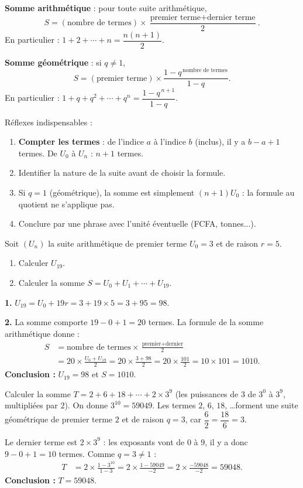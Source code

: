 \documentclass[11pt]{article}
\begin{document}
\begin{methode}
\textbf{Somme arithmétique} : pour toute suite arithmétique,
\[ S = (\text{nombre de termes})\times\frac{\text{premier terme}+\text{dernier terme}}{2}. \]
En particulier : $1+2+\cdots+n=\dfrac{n(n+1)}{2}$.

\textbf{Somme géométrique} : si $q\neq 1$,
\[ S = (\text{premier terme})\times\frac{1-q^{\,\text{nombre de termes}}}{1-q}. \]
En particulier : $1+q+q^2+\cdots+q^n=\dfrac{1-q^{\,n+1}}{1-q}$.

Réflexes indispensables :
\begin{enumerate}
\item \textbf{Compter les termes} : de l'indice $a$ à l'indice $b$ (inclus), il y a $b-a+1$ termes. De $U_0$ à $U_n$ : $n+1$ termes.
\item Identifier la nature de la suite avant de choisir la formule.
\item Si $q=1$ (géométrique), la somme est simplement $(n+1)U_0$ : la formule au quotient ne s'applique pas.
\item Conclure par une phrase avec l'unité éventuelle (FCFA, tonnes...).
\end{enumerate}
\end{methode}

\begin{exoresolu}
Soit $(U_n)$ la suite arithmétique de premier terme $U_0=3$ et de raison $r=5$.
\begin{enumerate}
\item Calculer $U_{19}$.
\item Calculer la somme $S=U_0+U_1+\cdots+U_{19}$.
\end{enumerate}
\tcblower
\textbf{1.} $U_{19}=U_0+19r=3+19\times 5=3+95=98$.

\textbf{2.} La somme comporte $19-0+1=20$ termes. La formule de la somme arithmétique donne :
\begin{align*}
S &= \text{nombre de termes}\times\frac{\text{premier}+\text{dernier}}{2}\\
&= 20\times\frac{U_0+U_{19}}{2} = 20\times\frac{3+98}{2} = 20\times\frac{101}{2} = 10\times 101 = 1010.
\end{align*}
\textbf{Conclusion :} $U_{19}=98$ et $S=1010$.
\end{exoresolu}

\begin{exoresolu}
Calculer la somme $T=2+6+18+\cdots+2\times 3^{9}$ (les puissances de $3$ de $3^0$ à $3^9$, multipliées par $2$). On donne $3^{10}=59049$.
\tcblower
Les termes $2$, $6$, $18$, \ldots forment une suite géométrique de premier terme $2$ et de raison $q=3$, car $\dfrac{6}{2}=\dfrac{18}{6}=3$.

Le dernier terme est $2\times 3^{9}$ : les exposants vont de $0$ à $9$, il y a donc $9-0+1=10$ termes. Comme $q=3\neq 1$ :
\begin{align*}
T &= 2\times\frac{1-3^{10}}{1-3} = 2\times\frac{1-59049}{-2} = 2\times\frac{-59048}{-2} = 59048.
\end{align*}
\textbf{Conclusion :} $T=59048$.
\end{exoresolu}
\end{document}
